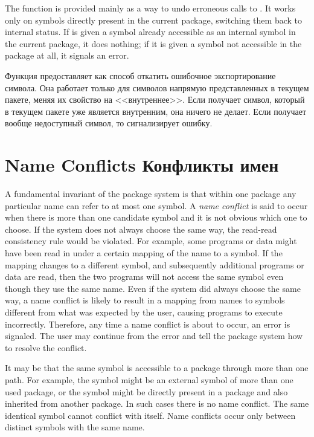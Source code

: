 The function  is provided mainly as a way to undo erroneous
calls to .  It works only on symbols directly present
in the current package, switching them back to internal status.  If
 is given a symbol already accessible as an internal
symbol in the current package, it does nothing; if it is given a symbol
not accessible in the package at all, it signals an error.

Функция  предоставляет как способ откатить ошибочное
экспортирование символа. Она работает только для символов напрямую
представленных в текущем пакете, меняя их свойство на <<внутреннее>>.
Если  получает символ, который в текущем пакете уже является
внутренним, она ничего не делает. Если получает вообще недоступный символ, то
сигнализирует ошибку.

\section{Name Conflicts Конфликты имен}
\label{NAME-CONFLICTS-SECTION}

A fundamental invariant of the package system is that within one package
any particular name can refer to at most one symbol.  A \emph{name conflict}
is said to occur when there is more than one candidate symbol and it is
not obvious which one to choose.  If the system does not always choose
the same way, the read-read consistency rule would be violated.  For
example, some programs or data might have been read in under a certain
mapping of the name to a symbol.  If the mapping changes to a different
symbol, and subsequently additional programs or data are read,
then the two programs will
not access the same symbol even though they use the same name.  Even if
the system did always choose the same way, a name conflict is likely to
result in a mapping from names to symbols different from what was expected by
the user, causing programs to execute incorrectly.  Therefore, any time
a name conflict is about to occur,
an error is signaled.  The user may continue
from the error and tell the package system how to resolve the conflict.

It may be that the same symbol is accessible to a package through more than
one path.  For example, the symbol might be
an external symbol of more than one used package, or the symbol
might be directly present in a package and also inherited from
another package.
In such cases there is no name conflict.
The same identical symbol cannot conflict with itself.
Name conflicts occur only between distinct symbols with
the same name.


